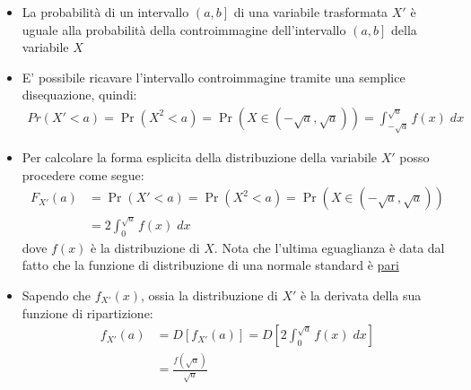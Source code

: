 \begin{itemize}
	\item La probabilità di un intervallo $ \left(a,b\right] $ di una variabile trasformata $ X' $ è uguale alla probabilità della controimmagine dell'intervallo $ \left(a,b\right] $ della variabile $ X $
	\item E' possibile ricavare l'intervallo controimmagine tramite una semplice disequazione, quindi:
	      \begin{align*}
		      Pr\left(X' < a\right) =\Pr\left(X^2 < a\right) =\Pr\left(X \in \left(-\sqrt{a}, \sqrt{a}\right)\right) = \int_{-\sqrt{a}}^{\sqrt{a}} f(x) \; dx
	      \end{align*}
	\item Per calcolare la forma esplicita della distribuzione della variabile $ X' $ posso procedere come segue:
	      \begin{align*}
		      F_{X'} \left(a\right) & =\Pr\left(X' < a\right) =\Pr\left(X^2 < a\right) =\Pr\left(X \in \left(-\sqrt{a}, \sqrt{a}\right)\right) \\
		                            & =2 \int_{0}^{\sqrt{a}} f(x) \; dx
	      \end{align*}
	      dove $ f\left(x\right) $ è la distribuzione di $ X $. Nota che l'ultima eguaglianza è data dal fatto che la funzione di distribuzione di una normale standard è \underline{pari}
	\item Sapendo che $ f_{X'}\left(x\right) $, ossia la distribuzione di $ X' $ è la derivata della sua funzione di ripartizione:
	      \begin{align*}
		      f_{X'}\left(a\right) & = D\left[f_{X'}\left(a\right)\right]= D\left[2 \int_{0}^{\sqrt{a}} f(x) \; dx\right] \\
		                           & = \frac{f\left(\sqrt{a}\right)}{\sqrt{a}}
	      \end{align*}
\end{itemize}
